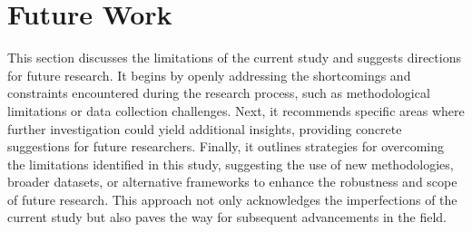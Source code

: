 \section{Future Work}

This section discusses the limitations of the current study and suggests directions for future research. It begins by openly addressing the shortcomings and constraints encountered during the research process, such as methodological limitations or data collection challenges. Next, it recommends specific areas where further investigation could yield additional insights, providing concrete suggestions for future researchers. Finally, it outlines strategies for overcoming the limitations identified in this study, suggesting the use of new methodologies, broader datasets, or alternative frameworks to enhance the robustness and scope of future research. This approach not only acknowledges the imperfections of the current study but also paves the way for subsequent advancements in the field.